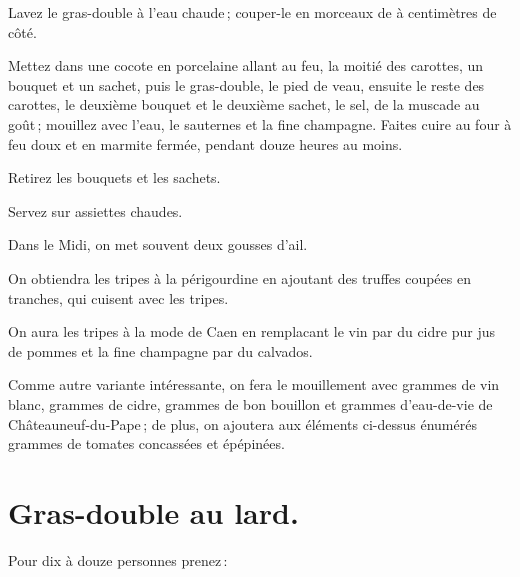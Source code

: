 Lavez le gras-double à l'eau chaude ; couper-le en morceaux de
{\mmm} à {\mmm} centimètres de côté.

Mettez dans une cocote en porcelaine allant au feu, la moitié des carottes, un
bouquet et un sachet, puis le gras-double, le pied de veau, ensuite le reste
des carottes, le deuxième bouquet et le deuxième sachet, le sel, de la muscade
au goût ; mouillez avec l'eau, le sauternes et la fine champagne. Faites cuire
au four à feu doux et en marmite fermée, pendant douze heures au moins.

Retirez les bouquets et les sachets.

Servez sur assiettes chaudes.

\sk

Dans le Midi, on met souvent deux gousses d'ail.

\sk

On obtiendra les tripes à la périgourdine en ajoutant des truffes coupées en
tranches, qui cuisent avec les tripes.

\sk

On aura les tripes à la mode de Caen en remplacant le vin par du cidre pur jus
de pommes et la fine champagne par du calvados.

\sk

Comme autre variante intéressante, on fera le mouillement avec {\mmm}
grammes de vin blanc, {\mmm} grammes de cidre, {\mmm} grammes de
bon bouillon et {\mmm} grammes d'eau-de-vie de Châteauneuf-du-Pape ; de
plus, on ajoutera aux éléments ci-dessus énumérés {\mmm} grammes de
tomates concassées et épépinées.

\newpage

\section*{\centering Gras-double au lard.}

Pour dix à douze personnes prenez :

\smallskip

